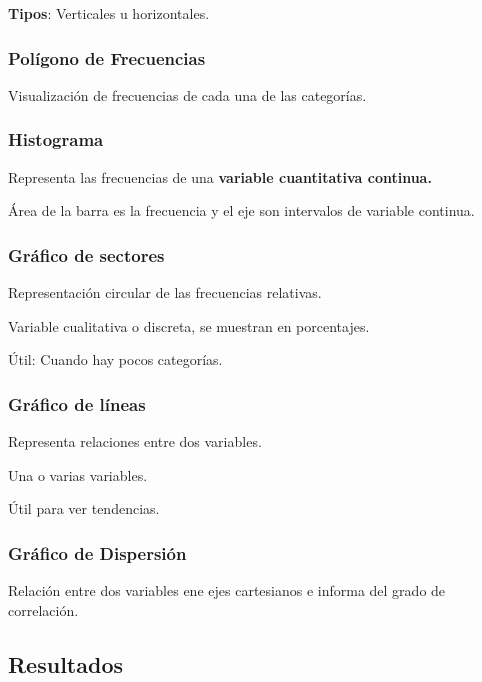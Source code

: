 \textbf{Tipos}: Verticales u horizontales.

\hypertarget{poluxedgono-de-frecuencias}{%
\subsubsection{Polígono de
Frecuencias}\label{poluxedgono-de-frecuencias}}

Visualización de frecuencias de cada una de las categorías.

\hypertarget{histograma}{%
\subsubsection{Histograma}\label{histograma}}

Representa las frecuencias de una \textbf{variable cuantitativa
continua.}

Área de la barra es la frecuencia y el eje son intervalos de variable
continua.

\hypertarget{gruxe1fico-de-sectores}{%
\subsubsection{Gráfico de sectores}\label{gruxe1fico-de-sectores}}

Representación circular de las frecuencias relativas.

Variable cualitativa o discreta, se muestran en porcentajes.

Útil: Cuando hay pocos categorías.

\hypertarget{gruxe1fico-de-luxedneas}{%
\subsubsection{Gráfico de líneas}\label{gruxe1fico-de-luxedneas}}

Representa relaciones entre dos variables.

Una o varias variables.

Útil para ver tendencias.

\hypertarget{gruxe1fico-de-dispersiuxf3n}{%
\subsubsection{Gráfico de
Dispersión}\label{gruxe1fico-de-dispersiuxf3n}}

Relación entre dos variables ene ejes cartesianos e informa del grado de
correlación.

\hypertarget{resultados}{%
\subsection{Resultados}\label{resultados}}

